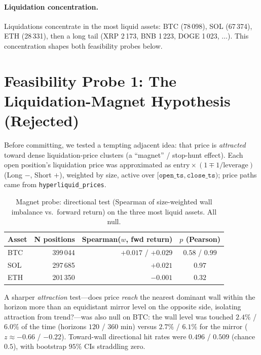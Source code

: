 \documentclass[11pt,a4paper]{article}
\begin{document}
\paragraph{Liquidation concentration.} Liquidations concentrate in the most liquid assets: BTC (78\,098), SOL (67\,374), ETH (28\,331), then a long tail (XRP 2\,173, BNB 1\,223, DOGE 1\,023, $\ldots$). This concentration shapes both feasibility probes below.

\section{Feasibility Probe 1: The Liquidation-Magnet Hypothesis (Rejected)}
\label{sec:m0magnet}

Before committing, we tested a tempting adjacent idea: that price is \emph{attracted} toward dense liquidation-price clusters (a ``magnet'' / stop-hunt effect). Each open position's liquidation price was approximated as $\text{entry}\times(1 \mp 1/\text{leverage})$ (Long $-$, Short $+$), weighted by size, active over $[\texttt{open\_ts}, \texttt{close\_ts})$; price paths came from \texttt{hyperliquid\_prices}.

\begin{table}[ht]
\centering
\caption{Magnet probe: directional test (Spearman of size-weighted wall imbalance vs.\ forward return) on the three most liquid assets. All null.}
\label{tab:magnet}
\begin{tabular}{lrrc}
\toprule
Asset & N positions & Spearman($w$, fwd return) & $p$ (Pearson) \\
\midrule
BTC & 399\,044 & $+0.017$ / $+0.029$ & $0.58$ / $0.99$ \\
SOL & 297\,685 & $+0.021$ & $0.97$ \\
ETH & 201\,350 & $-0.001$ & $0.32$ \\
\bottomrule
\end{tabular}
\end{table}

A sharper \emph{attraction} test---does price \emph{reach} the nearest dominant wall within the horizon more than an equidistant mirror level on the opposite side, isolating attraction from trend?---was also null on BTC: the wall level was touched $2.4\%$ / $6.0\%$ of the time (horizons $120$ / $360$ min) versus $2.7\%$ / $6.1\%$ for the mirror ($z\approx-0.66$ / $-0.22$). Toward-wall directional hit rates were $0.496$ / $0.509$ (chance $0.5$), with bootstrap $95\%$ CIs straddling zero.
\end{document}
